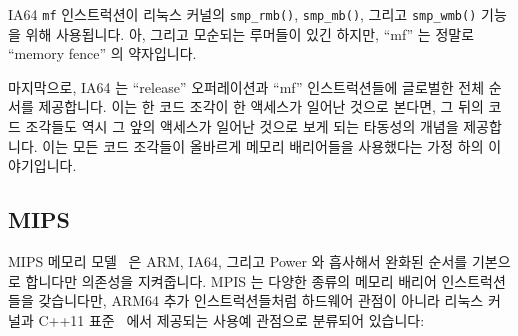 IA64 {\tt mf} 인스트럭션이 리눅스 커널의 {\tt smp\_rmb()}, {\tt smp\_mb()},
그리고 {\tt smp\_wmb()} 기능을 위해 사용됩니다.
아, 그리고 모순되는 루머들이 있긴 하지만, ``mf'' 는 정말로 ``memory fence'' 의
약자입니다.

마지막으로, IA64 는 ``release'' 오퍼레이션과 ``mf'' 인스트럭션들에 글로벌한
전체 순서를 제공합니다.
이는 한 코드 조각이 한 액세스가 일어난 것으로 본다면, 그 뒤의 코드 조각들도
역시 그 앞의 액세스가 일어난 것으로 보게 되는 타동성의 개념을 제공합니다.
이는 모든 코드 조각들이 올바르게 메모리 배리어들을 사용했다는 가정 하의
이야기입니다.

\subsection{MIPS}

MIPS 메모리 모델~\cite[Table 6.6]{MIPSvII-A-2015} 은 ARM, IA64, 그리고 Power 와
흡사해서 완화된 순서를 기본으로 합니다만 의존성을 지켜줍니다.
MPIS 는 다양한 종류의 메모리 배리어 인스트럭션들을 갖습니다만,  ARM64 추가
인스트럭션들처럼 하드웨어 관점이 아니라 리눅스 커널과 C++11
표준~\cite{RichardSmith2015N4527} 에서 제공되는 사용예 관점으로 분류되어
있습니다:

